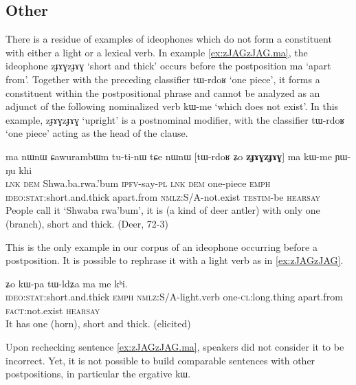 \documentclass[oldfontcommands,oneside,a4paper,11pt]{article}
\newcommand{\ipa}[1]{{\phon \mbox{#1}}} %
\begin{document}


    \subsection{Other}
   There is a residue of examples of ideophones which do not form a constituent with either a light or a lexical verb. In example \ref{ex:zJAGzJAG.ma}, the ideophone 	\ipa{zɟɤɣzɟɤɣ} `short and thick' occurs before the postposition \ipa{ma} `apart from'. Together with the preceding classifier \ipa{tɯ-rdoʁ}  `one piece', it forms a constituent within the postpositional phrase and cannot be analyzed as an adjunct of the following nominalized verb  	\ipa{kɯ-me} `which does not exist'. In this example, 	\ipa{zɟɤɣzɟɤɣ} `upright' is a postnominal modifier, with the classifier \ipa{tɯ-rdoʁ} `one piece' acting as  the head of the clause.
   
    \begin{exe}
\ex \label{ex:zJAGzJAG.ma}
\gll 
\ipa{ma} 	\ipa{nɯnɯ} 	\ipa{ɕawurambɯm} 	\ipa{tu-ti-nɯ} 	\ipa{tɕe} 	\ipa{nɯnɯ} 	 [\ipa{tɯ-rdoʁ} 	\ipa{ʑo} 	\ipa{\textbf{zɟɤɣzɟɤɣ}}] 	\ipa{ma} 	\ipa{kɯ-me} 	\ipa{ɲɯ-ŋu} 	\ipa{khi} \\
\textsc{lnk} \textsc{dem} Shwa.ba.rwa.'bum \textsc{ipfv}-say-\textsc{pl} \textsc{lnk} \textsc{dem} one-piece \textsc{emph} \textsc{ideo:stat}:short.and.thick apart.from \textsc{nmlz}:S/A-not.exist \textsc{testim}-be \textsc{hearsay} \\
\glt People call it `Shwaba rwa'bum', it is (a  kind of deer antler) with only one (branch), short and thick. 
 (Deer, 72-3)
\end{exe}

This is the only example in our corpus of an ideophone occurring before a postposition. It is possible to rephrase it with a light verb as in \ref{ex:zJAGzJAG}.  
    \begin{exe}
\ex \label{ex:zJAGzJAG}
\gll \ipa{\textbf{zɟɤɣzɟɤɣ}} 	\ipa{ʑo} 	\ipa{kɯ-pa} 	\ipa{tɯ-ldʑa} 	\ipa{ma} 	\ipa{me} 	\ipa{kʰi.}  \\
\textsc{ideo:stat}:short.and.thick \textsc{emph} \textsc{nmlz}:S/A-light.verb one-\textsc{cl}:long.thing apart.from \textsc{fact}:not.exist \textsc{hearsay} \\
\glt It  has one (horn), short and thick. (elicited)
\end{exe}

Upon rechecking  sentence \ref{ex:zJAGzJAG.ma}, speakers did not consider it to be incorrect. Yet,  it is not possible to build comparable sentences with other postpositions, in particular the ergative \ipa{kɯ}. 
\end{document}
